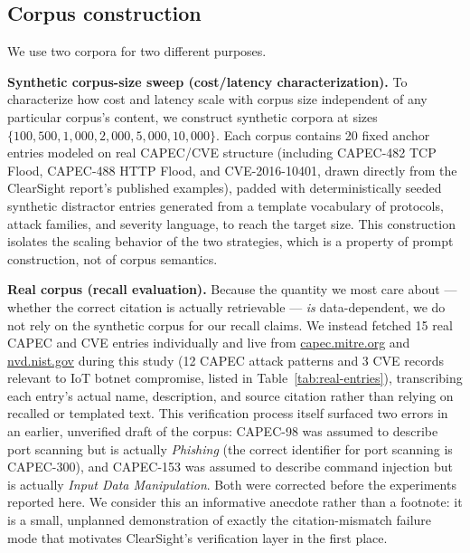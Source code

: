 \documentclass[11pt]{article}
\begin{document}
\subsection{Corpus construction}

We use two corpora for two different purposes.

\textbf{Synthetic corpus-size sweep (cost/latency characterization).} To characterize how cost and latency scale with corpus size independent of any particular corpus's content, we construct synthetic corpora at sizes $\{100, 500, 1{,}000, 2{,}000, 5{,}000, 10{,}000\}$. Each corpus contains 20 fixed anchor entries modeled on real CAPEC/CVE structure (including CAPEC-482 TCP Flood, CAPEC-488 HTTP Flood, and CVE-2016-10401, drawn directly from the ClearSight report's published examples), padded with deterministically seeded synthetic distractor entries generated from a template vocabulary of protocols, attack families, and severity language, to reach the target size. This construction isolates the scaling behavior of the two strategies, which is a property of prompt construction, not of corpus semantics.

\textbf{Real corpus (recall evaluation).} Because the quantity we most care about --- whether the correct citation is actually retrievable --- \emph{is} data-dependent, we do not rely on the synthetic corpus for our recall claims. We instead fetched 15 real CAPEC and CVE entries individually and live from \url{capec.mitre.org} and \url{nvd.nist.gov} during this study (12 CAPEC attack patterns and 3 CVE records relevant to IoT botnet compromise, listed in Table~\ref{tab:real-entries}), transcribing each entry's actual name, description, and source citation rather than relying on recalled or templated text. This verification process itself surfaced two errors in an earlier, unverified draft of the corpus: CAPEC-98 was assumed to describe port scanning but is actually \emph{Phishing} (the correct identifier for port scanning is CAPEC-300), and CAPEC-153 was assumed to describe command injection but is actually \emph{Input Data Manipulation}. Both were corrected before the experiments reported here. We consider this an informative anecdote rather than a footnote: it is a small, unplanned demonstration of exactly the citation-mismatch failure mode that motivates ClearSight's verification layer in the first place.
\end{document}

